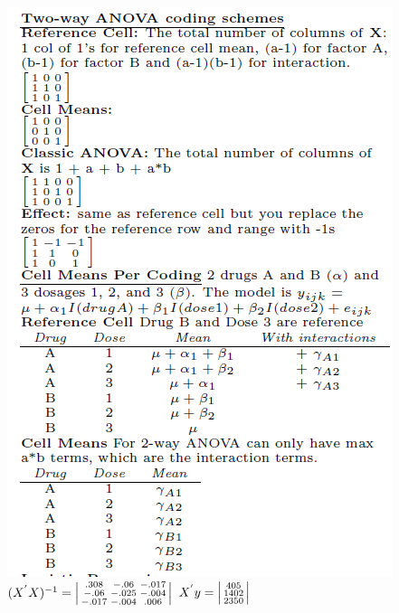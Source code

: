 \documentclass[10pt,landscape]{article}
\newenvironment{lmat}
{\left|\begin{smallmatrix}}
	{\end{smallmatrix}\right|}
\begin{document}
\begin{multicols*}{4}
\setlength{\columnseprule}{.25pt}
\setlength{\premulticols}{.25pt}
\setlength{\postmulticols}{.25pt}
\setlength{\multicolsep}{.25pt}
\setlength{\columnsep}{.25pt}
\includegraphics[scale=.55]{fig/2way.png}\\
$(X^{'}X)^{-1}=\begin{lmat}
.308&-.06&-.017\\
-.06&-.025&-.004\\
-.017&-.004&.006
\end{lmat}$ $X^{'}y=\begin{lmat}
405\\1402\\2350
\end{lmat}$\\
\end{multicols*}
\end{document}
